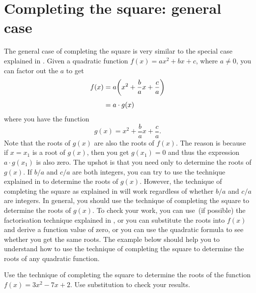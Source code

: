 \documentclass[a4paper,oneside,12pt]{article}
\begin{document}

\section{Completing the square: general case}

The general case of completing the square is very similar to the
special case explained
in .  Given
a quadratic function $f(x) = ax^2 + bx + c$, where $a \neq 0$, you can
factor out the $a$ to get
\begin{align*}
f(x)
&=
a
\parenthesis*{
  x^2 + \frac{b}{a}x + \frac{c}{a}
} \\[4pt]
&=
a \cdot g(x)
\end{align*}
where you have the function
\[
g(x)
=
x^2 + \frac{b}{a}x + \frac{c}{a}.
\]
Note that the roots of $g(x)$ are also the roots of $f(x)$.  The
reason is because if $x = x_1$ is a root of $g(x)$, then you get
$g(x_1) = 0$ and thus the expression $a \cdot g(x_1)$ is also zero.
The upshot is that you need only to determine the roots of $g(x)$.  If
$b / a$ and $c / a$ are both integers, you can try to use the
technique explained in  to
determine the roots of $g(x)$.  However, the technique of completing
the square as explained
in  will
work regardless of whether $b / a$ and $c / a$ are integers.  In
general, you should use the technique of completing the square to
determine the roots of $g(x)$.  To check your work, you can use~(if
possible) the factorisation technique explained
in , or you can substitute
the roots into $f(x)$ and derive a function value of zero, or you can
use the quadratic formula to see whether you get the same roots.  The
example below should help you to understand how to use the technique
of completing the square to determine the roots of any quadratic
function.

\begin{example}
\label{eg:quadroots:completing_square_a3_bminus7_c2}
Use the technique of completing the square to determine the roots of
the function $f(x) = 3x^2 - 7x + 2$.  Use substitution to check your
results.
\end{example}
\end{document}
